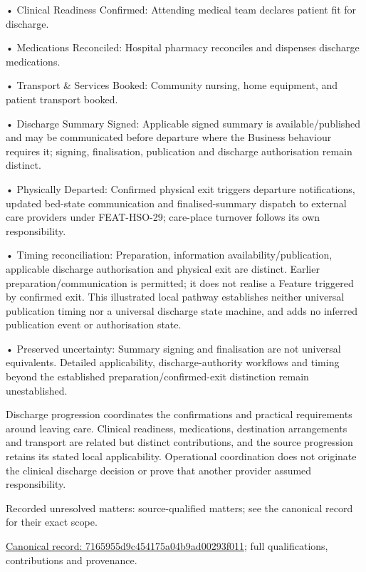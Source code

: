 •
Clinical Readiness Confirmed: Attending medical team declares patient fit for discharge.



•
Medications Reconciled: Hospital pharmacy reconciles and dispenses discharge medications.



•
Transport \& Services Booked: Community nursing, home equipment, and patient transport booked.



•
Discharge Summary Signed: Applicable signed summary is available/published and may be communicated before departure where the Business behaviour requires it; signing, finalisation, publication and discharge authorisation remain distinct.



•
Physically Departed: Confirmed physical exit triggers departure notifications, updated bed-state communication and finalised-summary dispatch to external care providers under FEAT-HSO-29; care-place turnover follows its own responsibility.



•
Timing reconciliation: Preparation, information availability/publication, applicable discharge authorisation and physical exit are distinct. Earlier preparation/communication is permitted; it does not realise a Feature triggered by confirmed exit. This illustrated local pathway establishes neither universal publication timing nor a universal discharge state machine, and adds no inferred publication event or authorisation state.



•
Preserved uncertainty: Summary signing and finalisation are not universal equivalents. Detailed applicability, discharge-authority workflows and timing beyond the established preparation/confirmed-exit distinction remain unestablished.



Discharge progression coordinates the confirmations and practical requirements around leaving care. Clinical readiness, medications, destination arrangements and transport are related but distinct contributions, and the source progression retains its stated local applicability. Operational coordination does not originate the clinical discharge decision or prove that another provider assumed responsibility.


{\small Recorded unresolved matters: source-qualified matters; see the canonical record for their exact scope.}\par
{\footnotesize \href{../../../../continuum/business/business-process/7165955d9c454175a04b9ad00293f011.md}{Canonical record: 7165955d9c454175a04b9ad00293f011}; full qualifications, contributions and provenance.}\par
